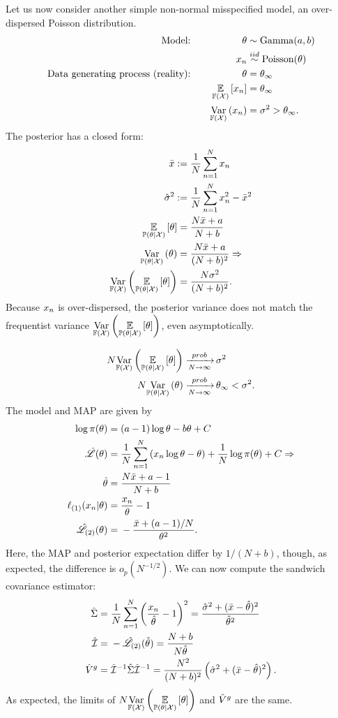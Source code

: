 Let us now consider another simple non-normal misspecified model, an
over-dispersed Poisson distribution.
%
\begin{align*}
%
\textrm{Model:}\quad&&
\theta &\sim \mathrm{Gamma}(a, b)\\
&&x_n &\iid \mathrm{Poisson}(\theta)\\
\textrm{Data generating process (reality):}\quad&&
\theta &= \thetatrue\\
&&\expect{\xfdist}{x_n} &= \thetatrue \\
&&\var{\xfdist}{x_n} &= \sigma^2 > \thetatrue.
%
\end{align*}
%
The posterior has a closed form:
%
\begin{align*}
%
\bar{\x} :={}& \meann x_n\\
\hat{\sigma}^2 :={}& \meann x_n^2 - \bar{\x}^2\\
\expect{\post}{\theta} ={}& \frac{N\bar{\x} + a}{N + b}\\
\var{\post}{\theta} ={}& \frac{N\bar{\x} + a}{(N + b)^2} \Rightarrow\\
\var{\xfdist}{\expect{\post}{\theta}} ={}& \frac{N \sigma^2}{(N + b)^2}.
%
\end{align*}
%
Because $x_n$ is over-dispersed, the posterior variance does not match
the frequentist variance $\underset{\mathbb{F}({\mathcal{X}})}{\mathrm{Var}}\left(\underset{\mathbb{P}(\theta | {\mathcal{X}})}{\mathbb{E}}\left[\theta\right]\right)$,
even asymptotically.

%
\begin{align*}
%
N \var{\xfdist}{\expect{\post}{\theta}} \plim& \sigma^2\\
N \var{\post}{\theta} \plim& \thetatrue < \sigma^2.
%
\end{align*}
%
The model and MAP are given by
%
\begin{align*}
%
\log \pi(\theta) ={}& (a - 1) \log \theta - b\theta + C\\
\likhat(\theta) ={}&
    \meann \left(x_n \log \theta - \theta \right) +
    \frac{1}{N} \log \pi(\theta) + C \Rightarrow \\
\thetahat ={}& \frac{N \bar{\x} + a - 1}{N + b}\\
\ellgrad{1}(\x_n \vert \theta) ={}& \frac{\x_n}{\theta} - 1 \\
\likhatk{2}(\theta) ={}& -\frac{\bar{\x} + (a - 1) / N}{\theta^2}.
%
\end{align*}
%
Here, the MAP and posterior expectation differ by $1 / (N + b)$,
though, as expected, the difference is $o_p(N^{-1/2})$. We
can now compute the sandwich covariance estimator:
%
\begin{align*}
%
\scorecovhat ={}& \meann \left(\frac{\x_n}{\thetahat} - 1\right)^2 =
    \frac{\hat\sigma^2 + (\bar{\x} - \thetahat)^2}{\thetahat^{2}} \\
\infohat ={}& -\likhatk{2}(\thetahat) = \frac{N + b}{N \thetahat}\\
\gcovhat ={}& \infohat^{-1} \scorecovhat \infohat^{-1}
= \frac{N^2}{(N + b)^2} \left(\hat\sigma^2 + (\bar{\x} - \thetahat)^2\right).
%
\end{align*}
%
As expected, the limits of $N \underset{\mathbb{F}({\mathcal{X}})}{\mathrm{Var}}\left(\underset{\mathbb{P}(\theta | {\mathcal{X}})}{\mathbb{E}}\left[\theta\right]\right)$ and
$\hat{V}^{g}$ are the same.

